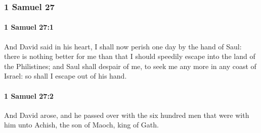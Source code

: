 	\subsubsection{1 Samuel 27} %
		\label{1SAMUEL-27}

		\paragraph{1 Samuel 27:1} %
			\label{1SAMUEL-27-1}

			And David said in his heart, I shall now perish one day by the hand of Saul: there is nothing better for me than that I should speedily escape into the land of the Philistines; and Saul shall despair of me, to seek me any more in any coast of Israel: so shall I escape out of his hand.


		\paragraph{1 Samuel 27:2} %
			\label{1SAMUEL-27-2}

			And David arose, and he passed over with the six hundred men that were with him unto Achish, the son of Maoch, king of Gath.

